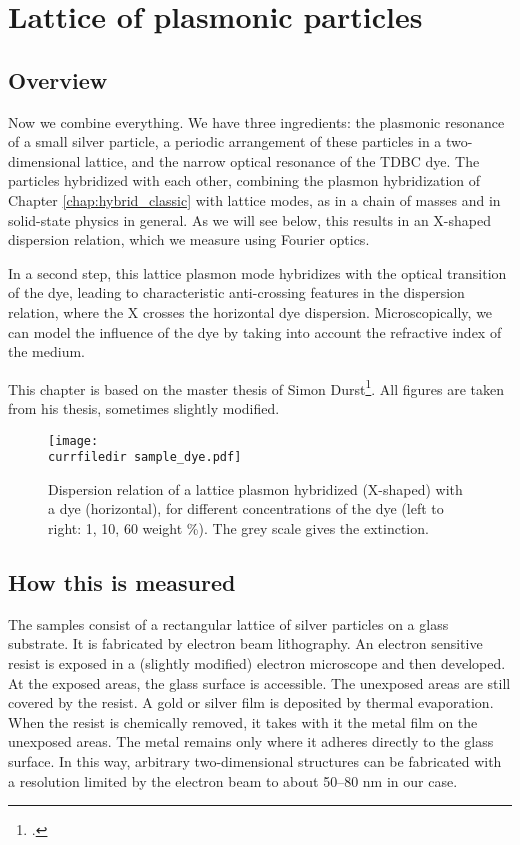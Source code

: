\renewcommand{\lastmod}{December 1, 2023}
\renewcommand{\chapterauthors}{Markus Lippitz}


\chapter{Lattice of plasmonic particles}

\section{Overview}

Now we combine everything. We have three ingredients: the plasmonic resonance of a small silver particle, a periodic arrangement of these particles in a two-dimensional lattice, and the narrow optical resonance of the TDBC dye. The particles hybridized with each other, combining the plasmon hybridization of Chapter \ref{chap:hybrid_classic} with lattice modes, as in a chain of masses and in solid-state physics in general. As we will see below, this results in an X-shaped dispersion relation, which we measure using Fourier optics.

In a second step, this lattice plasmon mode hybridizes with the optical transition of the dye, leading to characteristic anti-crossing features in the dispersion relation, where the X crosses the horizontal dye dispersion. Microscopically, we can model the influence of the dye by taking into account the refractive index of the medium.

This chapter is based on the master thesis of Simon Durst\footcite{Durst21}. All figures are taken from his thesis, sometimes slightly modified.


\begin{figure}
  \texttt{[image: \\currfiledir sample\_dye.pdf]}
  \caption{Dispersion relation of a lattice plasmon hybridized (X-shaped) with a dye (horizontal), for different concentrations of the dye (left to right: 1, 10, 60 weight \%). The grey scale gives the extinction. \label{fig:8_intro} }
  \end{figure}
  

  

\section{How this is  measured}

The samples consist of a rectangular lattice of silver particles on a glass substrate. It is fabricated by electron beam lithography. An electron sensitive resist is exposed in a (slightly modified) electron microscope and then developed. At the exposed areas, the glass surface is accessible. The unexposed areas are still covered by the resist.  A gold or silver film is deposited by thermal evaporation. When the resist is chemically removed, it takes with it the metal film on the unexposed areas. The metal remains only where it adheres directly to the glass surface. In this way, arbitrary two-dimensional structures can be fabricated with a resolution limited by the electron beam to about 50--80 nm in our case.

